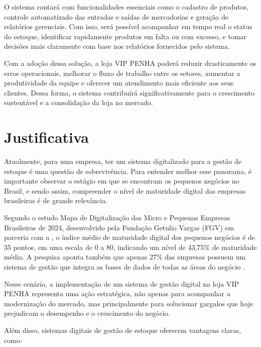\documentclass[
	12pt,				%
	openany,			%
	twoside,			%
	a4paper,			%
	english,			%
	brazil				%
	]{abntex2}
\begin{document}
O sistema contará com funcionalidades essenciais como o cadastro de produtos, controle automatizado das entradas e saídas de mercadorias e geração de relatórios gerenciais. Com isso, será possível acompanhar em tempo real o status do estoque, identificar rapidamente produtos em falta ou com excesso, e tomar decisões mais claramente com base nos relatórios fornecidos pelo sistema.

Com a adoção dessa solução, a loja VIP PENHA poderá reduzir drasticamente os erros operacionais, melhorar o fluxo de trabalho entre os setores, aumentar a produtividade da equipe e oferecer um atendimento mais eficiente aos seus clientes. Dessa forma, o sistema contribuirá significativamente para o crescimento sustentável e a consolidação da loja no mercado.
 

\section{Justificativa}
Atualmente, para uma empresa, ter um sistema digitalizado para a gestão de estoque é uma questão de sobrevivência. Para entender melhor esse panorama, é importante observar o estágio em que se encontram os pequenos negócios no Brasil, e sendo assim, compreender o nível de maturidade digital das empresas brasileiras é de grande relevância. 

Segundo o estudo Mapa de Digitalização das Micro e Pequenas Empresas Brasileiras de 2024, desenvolvido pela Fundação Getulio Vargas (FGV) em parceria com a  , o índice médio de maturidade digital dos pequenos negócios é de 35 pontos, em uma escala de 0 a 80, indicando um nível de 43,75\% de maturidade média. A pesquisa aponta também que apenas 27\% das empresas possuem um sistema de gestão que integra as bases de dados de todas as áreas do negócio . 

Nesse cenário, a implementação de um sistema de gestão digital na loja VIP PENHA representa uma ação estratégica, não apenas para acompanhar a modernização do mercado, mas principalmente para solucionar gargalos que hoje prejudicam o desempenho e o crescimento do negócio.

Além disso, sistemas digitais de gestão de estoque oferecem vantagens claras, como:
\end{document}
